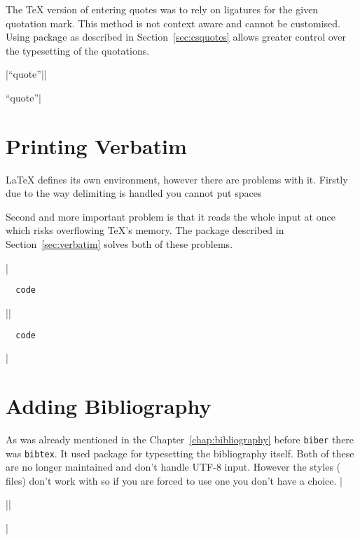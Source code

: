 The \TeX{} version of entering quotes was to rely on ligatures for the given
quotation mark. This method is not context aware and cannot be customised.
Using  package as described in Section~\ref{sec:csquotes} allows
greater control over the typesetting of the quotations.

\chto|``quote''||\usepackage{csquotes}
\enquote{quote}|

\section{Printing Verbatim}

\LaTeX{} defines its own  environment, however there are problems
with it. Firstly due to the way delimiting is handled you cannot put spaces
Second and more important problem is that it reads the whole input at once
which risks overflowing \TeX{}'s memory. The  package described
in Section~\ref{sec:verbatim} solves both of these problems.
\begin{chktexignore}
\chto|\begin{verbatim}
  code
\end{verbatim}||\usepackage{verbatim}
\begin{verbatim}
  code
\end{verbatim}|
\end{chktexignore}

\section{Adding Bibliography}

As was already mentioned in the Chapter~\ref{chap:bibliography} before
\texttt{biber} there was \texttt{bibtex}. It used  package for
typesetting the bibliography itself. Both of these are no longer maintained and
don't handle UTF-8 input. However the  styles ( files)
don't work with  so if you are forced to use one you don't have a
choice.
\chto|\usepackage{natbib}||\usepackage{biblatex}|

\endgroup
